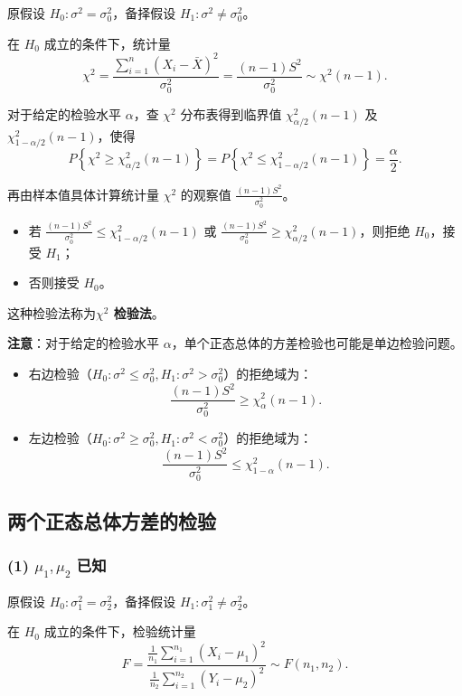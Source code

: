 \documentclass[11pt,a4paper]{report}
\theoremstyle{definition}
\begin{document}
原假设 $H_{0}\colon\sigma^{2}=\sigma_{0}^{2}$，备择假设 $H_{1}\colon\sigma^{2}\neq\sigma_{0}^{2}$。

在 $H_{0}$ 成立的条件下，统计量
\[
\chi^{2}=\frac{\sum_{i=1}^{n}(X_{i}-\bar{X})^{2}}{\sigma_{0}^{2}}=\frac{(n-1)S^{2}}{\sigma_{0}^{2}}\sim\chi^{2}(n-1).
\]

对于给定的检验水平 $\alpha$，查 $\chi^{2}$ 分布表得到临界值 $\chi_{\alpha/2}^{2}(n-1)$ 及 $\chi_{1-\alpha/2}^{2}(n-1)$，使得
\[
P\left\{\chi^{2}\geq\chi_{\alpha/2}^{2}(n-1)\right\}=P\left\{\chi^{2}\leq\chi_{1-\alpha/2}^{2}(n-1)\right\}=\frac{\alpha}{2}.
\]

再由样本值具体计算统计量 $\chi^{2}$ 的观察值 $\frac{(n-1)S^{2}}{\sigma_{0}^{2}}$。
\begin{itemize}[leftmargin=2em]
    \item 若 $\frac{(n-1)S^{2}}{\sigma_{0}^{2}}\leq\chi_{1-\alpha/2}^{2}(n-1)$ 或 $\frac{(n-1)S^{2}}{\sigma_{0}^{2}}\geq\chi_{\alpha/2}^{2}(n-1)$，则拒绝 $H_{0}$，接受 $H_{1}$；
    \item 否则接受 $H_{0}$。
\end{itemize}
这种检验法称为\textbf{$\chi^{2}$ 检验法}。

\textbf{注意}：对于给定的检验水平 $\alpha$，单个正态总体的方差检验也可能是单边检验问题。
\begin{itemize}[leftmargin=2em]
    \item 右边检验（$H_{0}\colon\sigma^{2}\leq\sigma_{0}^{2}, H_{1}\colon\sigma^{2}>\sigma_{0}^{2}$）的拒绝域为：
    \[
    \frac{(n-1)S^{2}}{\sigma_{0}^{2}}\geq\chi_{\alpha}^{2}(n-1).
    \]
    \item 左边检验（$H_{0}\colon\sigma^{2}\geq\sigma_{0}^{2}, H_{1}\colon\sigma^{2}<\sigma_{0}^{2}$）的拒绝域为：
    \[
    \frac{(n-1)S^{2}}{\sigma_{0}^{2}}\leq\chi_{1-\alpha}^{2}(n-1).
    \]
\end{itemize}

\subsection{两个正态总体方差的检验}

\subsubsection*{(1) $\mu_{1},\mu_{2}$ 已知}

原假设 $H_{0}\colon\sigma_{1}^{2}=\sigma_{2}^{2}$，备择假设 $H_{1}\colon\sigma_{1}^{2}\neq\sigma_{2}^{2}$。

在 $H_{0}$ 成立的条件下，检验统计量
\[
F=\frac{\frac{1}{n_{1}}\sum_{i=1}^{n_{1}}(X_{i}-\mu_{1})^{2}}{\frac{1}{n_{2}}\sum_{i=1}^{n_{2}}(Y_{i}-\mu_{2})^{2}}\sim F(n_{1},n_{2}).
\]
\end{document}
